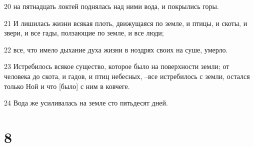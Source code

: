 \par 20 на пятнадцать локтей поднялась над ними вода, и покрылись горы.
\par 21 И лишилась жизни всякая плоть, движущаяся по земле, и птицы, и скоты, и звери, и все гады, ползающие по земле, и все люди;
\par 22 все, что имело дыхание духа жизни в ноздрях своих на суше, умерло.
\par 23 Истребилось всякое существо, которое было на поверхности земли; от человека до скота, и гадов, и птиц небесных, --все истребилось с земли, остался только Ной и что [было] с ним в ковчеге.
\par 24 Вода же усиливалась на земле сто пятьдесят дней.

\chapter{8}

